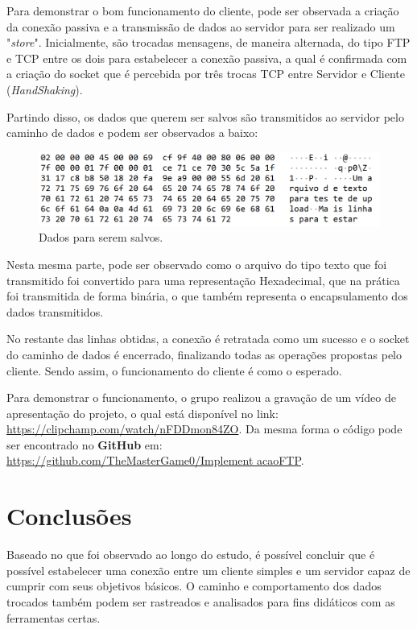 \documentclass[11pt]{IEEEtran}
\begin{document}
Para demonstrar o bom funcionamento do cliente, pode ser observada a criação da conexão passiva e a transmissão de dados ao servidor para ser realizado um "\textit{store}". Inicialmente, são trocadas mensagens, de maneira alternada, do tipo FTP e TCP entre os dois para estabelecer a conexão passiva, a qual é confirmada com a criação do socket que é percebida por três trocas TCP entre Servidor e Cliente (\textit{HandShaking}).

Partindo disso, os dados que querem ser salvos são transmitidos ao servidor pelo caminho de dados e podem ser observados a baixo:

\begin{figure}[h]
   \centering
   \includegraphics[width = 0.9\linewidth]{Dados do Store.png}  
   \caption{Dados para serem salvos.}
   \label{fig:Captura}
\end{figure}

Nesta mesma parte, pode ser observado como o arquivo do tipo texto que foi transmitido foi convertido para uma representação Hexadecimal, que na prática foi transmitida de forma binária, o que também representa o encapsulamento dos dados transmitidos.

No restante das linhas obtidas, a conexão é retratada como um sucesso e o socket do caminho de dados é encerrado, finalizando todas as operações propostas pelo cliente. Sendo assim, o funcionamento do cliente é como o esperado.

Para demonstrar o funcionamento, o grupo realizou a gravação de um vídeo de apresentação do projeto, o qual está disponível no link: \href{https://clipchamp.com/watch/nFDDmon84ZO}{https://clipchamp.com/watch/nFDDmon84ZO}. Da mesma forma o código pode ser encontrado no \textbf{GitHub} em: \href{https://github.com/TheMasterGame0/ImplementacaoFTP}{https://github.com/TheMasterGame0/Implement acaoFTP}.

\section{Conclusões}
Baseado no que foi observado ao longo do estudo, é possível concluir que é possível estabelecer uma conexão entre um cliente simples e um servidor capaz de cumprir com seus objetivos básicos. O caminho e comportamento dos dados trocados também podem ser rastreados e analisados para fins didáticos com as ferramentas certas.
 
\end{document}
